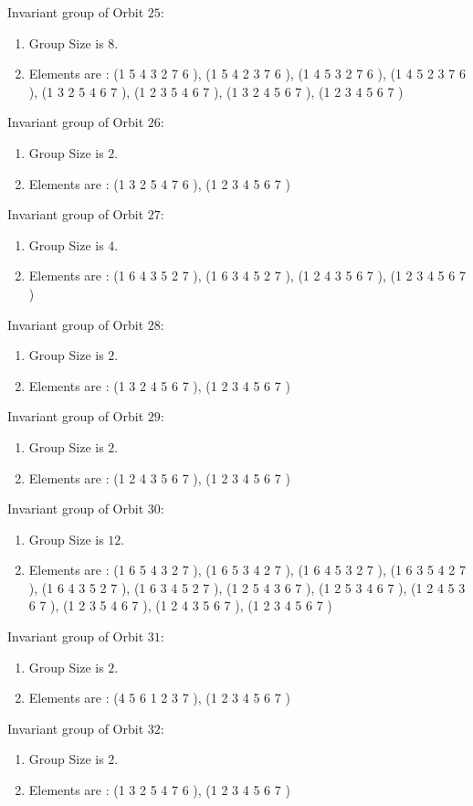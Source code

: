 \documentclass[12pt]{article}
\begin{document}
Invariant group of Orbit $25$:
\begin{enumerate}
\item Group Size is $8$.
\item Elements are : (1 5 4 3 2 7 6  ), (1 5 4 2 3 7 6  ), (1 4 5 3 2 7 6  ), (1 4 5 2 3 7 6  ), (1 3 2 5 4 6 7  ), (1 2 3 5 4 6 7  ), (1 3 2 4 5 6 7  ), (1 2 3 4 5 6 7  )
\end{enumerate}
Invariant group of Orbit $26$:
\begin{enumerate}
\item Group Size is $2$.
\item Elements are : (1 3 2 5 4 7 6  ), (1 2 3 4 5 6 7  )
\end{enumerate}
Invariant group of Orbit $27$:
\begin{enumerate}
\item Group Size is $4$.
\item Elements are : (1 6 4 3 5 2 7  ), (1 6 3 4 5 2 7  ), (1 2 4 3 5 6 7  ), (1 2 3 4 5 6 7  )
\end{enumerate}
Invariant group of Orbit $28$:
\begin{enumerate}
\item Group Size is $2$.
\item Elements are : (1 3 2 4 5 6 7  ), (1 2 3 4 5 6 7  )
\end{enumerate}
Invariant group of Orbit $29$:
\begin{enumerate}
\item Group Size is $2$.
\item Elements are : (1 2 4 3 5 6 7  ), (1 2 3 4 5 6 7  )
\end{enumerate}
Invariant group of Orbit $30$:
\begin{enumerate}
\item Group Size is $12$.
\item Elements are : (1 6 5 4 3 2 7  ), (1 6 5 3 4 2 7  ), (1 6 4 5 3 2 7  ), (1 6 3 5 4 2 7  ), (1 6 4 3 5 2 7  ), (1 6 3 4 5 2 7  ), (1 2 5 4 3 6 7  ), (1 2 5 3 4 6 7  ), (1 2 4 5 3 6 7  ), (1 2 3 5 4 6 7  ), (1 2 4 3 5 6 7  ), (1 2 3 4 5 6 7  )
\end{enumerate}
Invariant group of Orbit $31$:
\begin{enumerate}
\item Group Size is $2$.
\item Elements are : (4 5 6 1 2 3 7  ), (1 2 3 4 5 6 7  )
\end{enumerate}
Invariant group of Orbit $32$:
\begin{enumerate}
\item Group Size is $2$.
\item Elements are : (1 3 2 5 4 7 6  ), (1 2 3 4 5 6 7  )
\end{enumerate}
\end{document}
